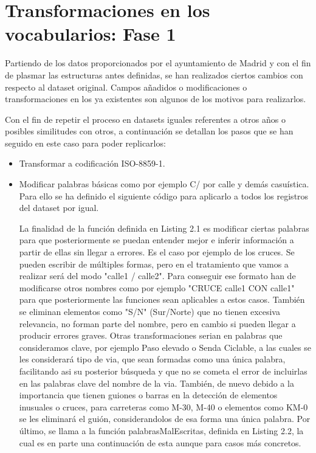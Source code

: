 
\section{Transformaciones en los vocabularios: Fase 1}

Partiendo de los datos proporcionados por el ayuntamiento de Madrid y con el fin de plasmar las estructuras antes definidas, se han realizados ciertos cambios con respecto al dataset original. Campos añadidos o modificaciones o transformaciones en los ya existentes son algunos de los motivos para realizarlos.

Con el fin de repetir el proceso en datasets iguales referentes a otros años o posibles similitudes con otros, a continuación se detallan los pasos que se han seguido en este caso para poder replicarlos:

\begin{itemize}
    \item Transformar a codificación ISO-8859-1.
    \item Modificar palabras básicas como por ejemplo C/ por calle y demás casuística. Para ello se ha definido el siguiente código para aplicarlo a todos los registros del dataset por igual.





La finalidad de la función definida en Listing 2.1 es modificar ciertas palabras para que posteriormente se puedan entender mejor e inferir información a partir de ellas sin llegar a errores.
\newline
Es el caso por ejemplo de los cruces. Se pueden escribir de múltiples formas, pero en el tratamiento que vamos a realizar será del modo "calle1 / calle2". Para conseguir ese formato han de modificarse otros nombres como por ejemplo "CRUCE calle1 CON calle1" para que posteriormente las funciones sean aplicables a estos casos.
\newline
También se eliminan elementos como "S/N" (Sur/Norte) que no tienen excesiva relevancia, no forman parte del nombre, pero en cambio si pueden llegar a producir errores graves.
\newline
Otras transformaciones serian en palabras que consideramos clave, por ejemplo Paso elevado o Senda Ciclable, a las cuales se les considerará tipo de via, que sean formadas como una única palabra, facilitando asi su posterior búsqueda y que no se cometa el error de incluirlas en las palabras clave del nombre de la via.
\newline
También, de nuevo debido a la importancia que tienen guiones o barras en la detección de elementos inusuales o cruces, para carreteras como M-30, M-40 o elementos como KM-0 se les eliminará el guión, considerandolos de esa forma una única palabra.
\newline
Por último, se llama a la función palabrasMalEscritas, definida en Listing 2.2, la cual es en parte una continuación de esta aunque para casos más concretos.


\end{itemize}
